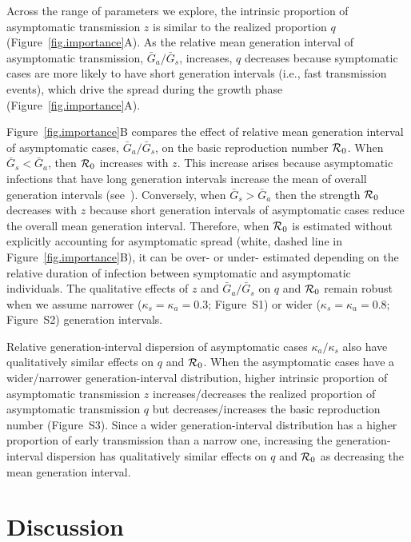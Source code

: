 Across the range of parameters we explore, the intrinsic proportion of asymptomatic transmission $z$ is similar to the realized proportion $q$ (Figure~\ref{fig.importance}A).
As the relative mean generation interval of asymptomatic transmission, $\bar G_a/\bar G_s$, increases, $q$ decreases because symptomatic cases are more likely to have short generation intervals (i.e., fast transmission events), which drive the spread during the growth phase (Figure~\ref{fig.importance}A).

Figure~\ref{fig.importance}B compares the effect of relative mean generation interval of asymptomatic cases, $\bar G_a/\bar G_s$, on the basic reproduction number ${\cal{R}}_0$.
When $\bar G_s < \bar G_a$, then ${\cal{R}}_0$ increases with $z$.
This increase arises because asymptomatic infections that have long generation intervals increase the mean of overall generation intervals (see~\citep{park_2019practical}).
Conversely, when $\bar G_s > \bar G_a$ then the strength ${\cal{R}}_0$ decreases with $z$ because short generation intervals of asymptomatic cases reduce the overall mean generation interval.
Therefore, when ${\cal{R}}_0$ is estimated without explicitly accounting for asymptomatic spread (white, dashed line in Figure~\ref{fig.importance}B), it can be over- or under- estimated depending on the relative duration of infection between symptomatic and asymptomatic individuals.
The qualitative effects of $z$ and $\bar G_a/\bar G_s$ on $q$ and ${\cal{R}}_0$ remain robust when we assume narrower ($\kappa_s = \kappa_a = 0.3$; Figure~S1) or wider ($\kappa_s = \kappa_a = 0.8$; Figure~S2) generation intervals.

Relative generation-interval dispersion of asymptomatic cases $\kappa_a/\kappa_s$ also have qualitatively similar effects on $q$ and ${\cal{R}}_0$.
When the asymptomatic cases have a wider/narrower generation-interval distribution, higher intrinsic proportion of asymptomatic transmission $z$ increases/decreases the realized proportion of asymptomatic transmission $q$ but decreases/increases the basic reproduction number (Figure~S3).
Since a wider generation-interval distribution has a higher proportion of early transmission than a narrow one, increasing the generation-interval dispersion has qualitatively similar effects on $q$ and ${\cal{R}}_0$ as decreasing the mean generation interval.

\section{Discussion}

